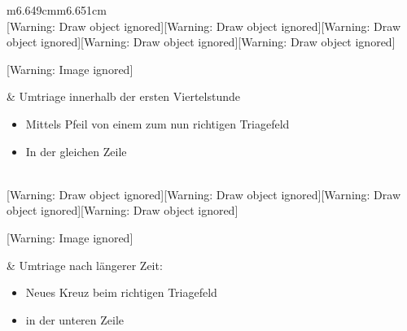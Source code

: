 \documentclass{article}
\begin{document}
\begin{center}
\tablehead{}\begin{supertabular}{m{6.649cm}m{6.651cm}}
\\
[Warning: Draw object ignored][Warning: Draw object ignored][Warning:
Draw object ignored][Warning: Draw object ignored][Warning: Draw object
ignored][Warning: Draw object ignored]

\begin{center}
 [Warning: Image ignored] %

\end{center}
 &
Umtriage innerhalb der ersten Viertelstunde

\begin{itemize}
\item Mittels Pfeil von einem zum nun richtigen Triagefeld

\item In der gleichen Zeile

\end{itemize}
\\
[Warning: Draw object ignored][Warning: Draw object ignored][Warning:
Draw object ignored][Warning: Draw object ignored][Warning: Draw object
ignored]

\begin{center}
 [Warning: Image ignored] %

\end{center}
 &
Umtriage nach l\"angerer Zeit:

\begin{itemize}
\item Neues Kreuz beim richtigen Triagefeld

\item in der unteren Zeile

\end{itemize}
\\
\end{supertabular}
\end{center}
\end{document}
